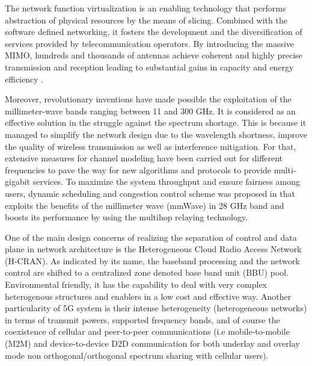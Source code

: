 \documentclass[conference,onecolumn,12pt]{IEEEtran}
\begin{document}
The network function virtualization is an enabling technology that performs abstraction of physical resources by the means of slicing. Combined with the software defined networking, it fosters the development and the diversification of services provided by telecommunication operators. By introducing the massive MIMO, hundreds and thousands of antennas achieve coherent and highly precise transmission and reception leading to substantial gains in capacity and energy efficiency \cite{survey5G2016}.

Moreover, revolutionary inventions have made possible the exploitation of the millimeter-wave bands ranging between 11 and 300 GHz. It is considered as an effective solution in the struggle against the spectrum shortage. This is because it managed to simplify the network design due to the wavelength shortness, improve the quality of wireless transmission as well as interference mitigation. For that, extensive measures for channel modeling have been carried out for different frequencies to pave the way for new algorithms and protocols to provide multi-gigabit services. To maximize the system throughput and ensure fairness among users, dynamic scheduling and congestion control scheme was proposed in \cite{mmWmultihop} that exploits the benefits of the millimeter wave (mmWave) in 28 GHz band and boosts its performance by using the multihop relaying technology.

One of the main design concerns of realizing the separation of control and data plane in network architecture is the Heterogeneous Cloud Radio Access Network (H-CRAN). As indicated by its name, the baseband processing and the network control are shifted to a centralized zone denoted base band unit (BBU) pool. Environmental friendly, it has the capability to deal with very complex heterogenous structures and enablers in a low cost and effective way. Another particularity of 5G system is their intense heterogeneity (heterogeneous networks) in terms of transmit powers, supported frequency bands, and of course the coexistence of cellular and peer-to-peer communications (i.e mobile-to-mobile (M2M) and device-to-device D2D communication for both underlay and overlay mode non orthogonal/orthogonal spectrum sharing with cellular users)\cite{M2MNajjar}.
\end{document}
